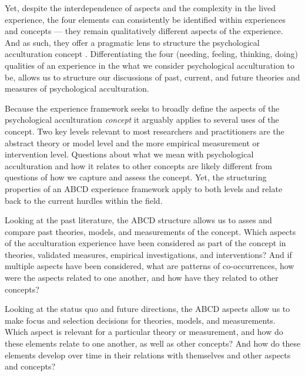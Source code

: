 \documentclass[man, 12pt, a4paper]{apa7}
\begin{document}
Yet, despite the interdependence of aspects and the complexity in the lived experience, the four elements can consistently be identified within experiences and concepts --- they remain qualitatively different aspects of the experience. And as such, they offer a pragmatic lens to structure the psychological acculturation concept \citep{Kuhn1962}. Differentiating the four (needing, feeling, thinking, doing) qualities of an experience in the what we consider psychological acculturation to be, allows us to structure our discussions of past, current, and future theories and measures of psychological acculturation.

Because the experience framework seeks to broadly define the aspects of the psychological acculturation \textit{concept} it arguably applies to several uses of the concept. Two key levels relevant to most researchers and practitioners are the abstract theory or model level and the more empirical measurement or intervention level. Questions about what we mean with psychological acculturation and how it relates to other concepts are likely different from questions of how we capture and assess the concept. Yet, the structuring properties of an ABCD experience framework apply to both levels and relate back to the current hurdles within the field.

Looking at the past literature, the ABCD structure allows us to asses and compare past theories, models, and measurements of the concept. Which aspects of the acculturation experience have been considered as part of the concept in theories, validated measures, empirical investigations, and interventions? And if multiple aspects have been considered, what are patterns of co-occurrences, how were the aspects related to one another, and how have they related to other concepts?

Looking at the status quo and future directions, the ABCD aspects allow us to make focus and selection decisions for theories, models, and measurements. Which aspect is relevant for a particular theory or measurement, and how do these elements relate to one another, as well as other concepts? And how do these elements develop over time in their relations with themselves and other aspects and concepts?
\end{document}
